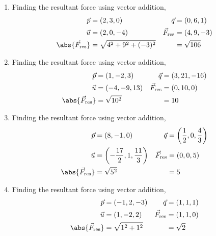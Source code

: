 \begin{enumerate}
    \item Finding the resultant force using vector addition,
          \begin{align}
              \vec{p}                           & = (2,3,0)                   &
              \vec{q}                           & = (0, 6, 1)                   \\
              \vec{u}                           & = (2, 0, -4)                &
              \vec{F}_{\text{res}}              & = (4, 9, -3)                  \\
              \abs{ \vec{F}_{\text{res}}} & = \sqrt{4^2 + 9^2 + (-3)^2} &
                                                & = \sqrt{106}
          \end{align}

    \item Finding the resultant force using vector addition,
          \begin{align}
              \vec{p}                           & = (1,-2,3)     &
              \vec{q}                           & = (3, 21, -16)   \\
              \vec{u}                           & = (-4, -9, 13) &
              \vec{F}_{\text{res}}              & = (0, 10, 0)     \\
              \abs{ \vec{F}_{\text{res}}} & = \sqrt{10^2}  &
                                                & = 10
          \end{align}

    \item Finding the resultant force using vector addition,
          \begin{align}
              \vec{p}                                       & = (8, -1, 0) &
              \vec{q}                                       & =
              \left( \frac{1}{2}, 0, \frac{4}{3} \right)                     \\
              \vec{u}                                       & =
              \left( -\frac{17}{2}, 1, \frac{11}{3} \right) &
              \vec{F}_{\text{res}}                          & =
              \left( 0, 0, 5 \right)                                         \\
              \abs{ \vec{F}_{\text{res}}}             & =
              \sqrt{5^2}                                    &
                                                            & = 5
          \end{align}

    \item Finding the resultant force using vector addition,
          \begin{align}
              \vec{p}                           & = (-1, 2, -3)      &
              \vec{q}                           & = (1, 1, 1)          \\
              \vec{u}                           & = (1, -2, 2)       &
              \vec{F}_{\text{res}}              & = (1, 1, 0)          \\
              \abs{ \vec{F}_{\text{res}}} & = \sqrt{1^2 + 1^2} &
                                                & = \sqrt{2}
          \end{align}


\end{enumerate}

